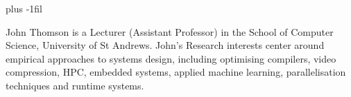 \documentclass[10pt,journal,compsoc]{IEEEtran}
\begin{document}
\baselineskip plus -1fil
\begin{IEEEbiography}{John Thomson \textnormal{is a Lecturer (Assistant Professor) in the School of Computer Science, University of St Andrews. John's Research interests center around empirical approaches to systems design, including optimising compilers, video compression, HPC, embedded systems, applied machine learning, parallelisation techniques and runtime systems.}}
\end{IEEEbiography}
\end{document}
